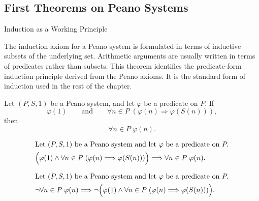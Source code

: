 \subsection{First Theorems on Peano Systems}

\begin{topicbox}{Induction as a Working Principle}
\begin{exposition}
The induction axiom for a Peano system is formulated in terms of inductive
subsets of the underlying set. Arithmetic arguments are usually written in
terms of predicates rather than subsets. This theorem identifies the
predicate-form induction principle derived from the Peano axioms. It is the
standard form of induction used in the rest of the chapter.
\end{exposition}

\begin{tcolorbox}[colback=thmbox, colframe=thmborder, arc=2pt,
  left=6pt, right=6pt, top=4pt, bottom=4pt,
  title={\small\textbf{Theorem (Induction Principle for a Peano System)}},
  fonttitle=\small\bfseries]
\begin{theorem}
\label{thm:induction-principle-for-peano-system}
Let $(P,S,1)$ be a Peano system, and let $\varphi$ be a predicate on $P$.
If
\[
\varphi(1)
\qquad\text{and}\qquad
\forall n \in P\;(\varphi(n) \Longrightarrow \varphi(S(n))),
\]
then
\[
\forall n \in P\;\varphi(n).
\]
\end{theorem}
\end{tcolorbox}

\begin{remark*}
\[
\begin{aligned}
&\text{Let } (P,S,1) \text{ be a Peano system and let } \varphi
\text{ be a predicate on } P.\\
&\Bigl(\varphi(1) \land
\forall n \in P\;(\varphi(n) \Longrightarrow \varphi(S(n)))\Bigr)
\Longrightarrow
\forall n \in P\;\varphi(n).
\end{aligned}
\]
\end{remark*}

\begin{remark*}
\[
\begin{aligned}
&\text{Let } (P,S,1) \text{ be a Peano system and let } \varphi
\text{ be a predicate on } P.\\
&\neg\forall n \in P\;\varphi(n)
\Longrightarrow
\neg\Bigl(\varphi(1) \land
\forall n \in P\;(\varphi(n) \Longrightarrow \varphi(S(n)))\Bigr).
\end{aligned}
\]
\end{remark*}


\end{topicbox}

